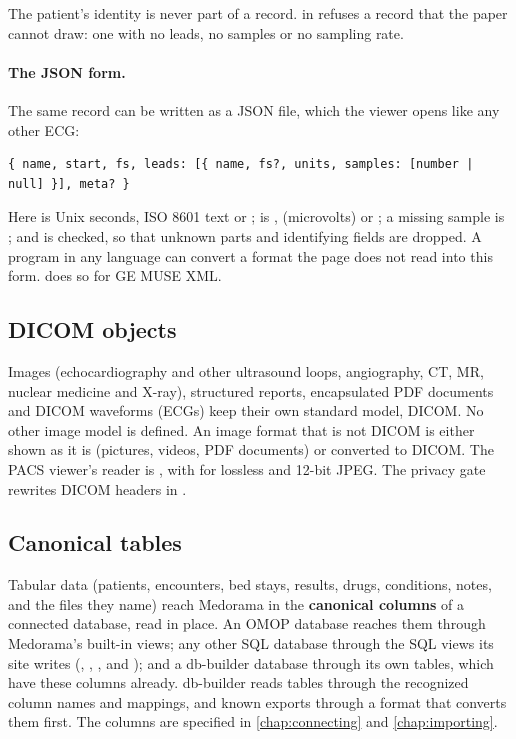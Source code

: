 The patient's identity is never part of a record.  in
 refuses a record that the paper cannot draw: one with no leads, no
samples or no sampling rate.

\paragraph{The JSON form.} The same record can be written as a JSON file, which the viewer opens
like any other ECG:
\begin{lstlisting}[style=text]
{ name, start, fs, leads: [{ name, fs?, units, samples: [number | null] }], meta? }
\end{lstlisting}
Here  is Unix seconds, ISO 8601 text or ;  is ,
 (microvolts) or ; a missing sample is ; and  is checked,
so that unknown parts and identifying fields are dropped. A program in any language can convert a
format the page does not read into this form.  does so for GE MUSE XML.

\subsection{DICOM objects}
\label{sec:readers-dicom}

Images (echocardiography and other ultrasound loops, angiography, CT, MR, nuclear medicine and
X-ray), structured reports, encapsulated PDF documents and DICOM waveforms (ECGs) keep their own
standard model, DICOM. No other image model is defined. An image format that is not DICOM is
either shown as it is (pictures, videos, PDF documents) or converted to DICOM. The PACS viewer's
reader is , with  for lossless and 12-bit JPEG. The
privacy gate rewrites DICOM headers in .

\subsection{Canonical tables}
\label{sec:readers-catalog}

Tabular data (patients, encounters, bed stays, results, drugs, conditions, notes, and the files
they name) reach Medorama in the \textbf{canonical columns} of a connected database, read in place.
An OMOP database reaches them through Medorama's built-in views; any other SQL database through
the SQL views its site writes (, , , and
); and a db-builder database through its own tables, which have these columns
already. db-builder reads tables through the recognized column names and mappings, and known
exports through a format that converts them first. The columns are specified in
\cref{chap:connecting} and \cref{chap:importing}.

